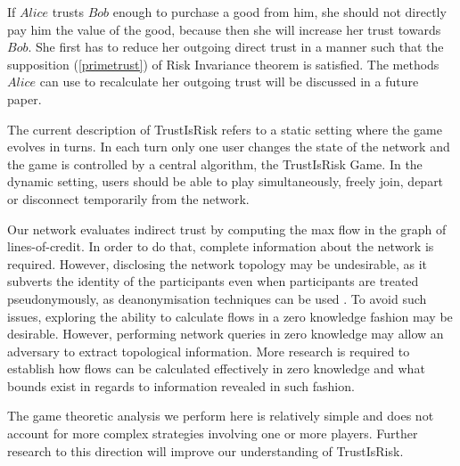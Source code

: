 \documentclass[11pt]{llncs}
\theoremstyle{definition}
\begin{document}
        If $Alice$ trusts $Bob$ enough to purchase a good from him, she should not directly pay him the value of the good,
        because then she will increase her trust towards $Bob$. She first has to reduce her outgoing direct trust in a manner
        such that the supposition (\ref{primetrust}) of Risk Invariance theorem is satisfied. The methods $Alice$ can use to
        recalculate her outgoing trust will be discussed in a future paper.

        The current description of TrustIsRisk refers to a static setting where the game evolves in turns. In each turn only
        one user changes the state of the network and the game is controlled by a central algorithm, the TrustIsRisk Game. In
        the dynamic setting, users should be able to play simultaneously, freely join, depart or disconnect temporarily from
        the network.

        Our network evaluates indirect trust by computing the max flow in the graph of lines-of-credit. In order to do that,
        complete information about the network is required. However, disclosing the network topology may be undesirable, as
        it subverts the identity of the participants even when participants are treated pseudonymously, as deanonymisation
        techniques can be used \cite{deanonymisation}. To avoid such issues, exploring the ability to calculate flows in a
        zero knowledge fashion may be desirable. However, performing network queries in zero knowledge may allow an adversary
        to extract topological information. More research is required to establish how flows can be calculated effectively in
        zero knowledge and what bounds exist in regards to information revealed in such fashion.

        The game theoretic analysis we perform here is relatively simple and does not account for more complex strategies
        involving one or more players. Further research to this direction will improve our understanding of TrustIsRisk.
\end{document}
